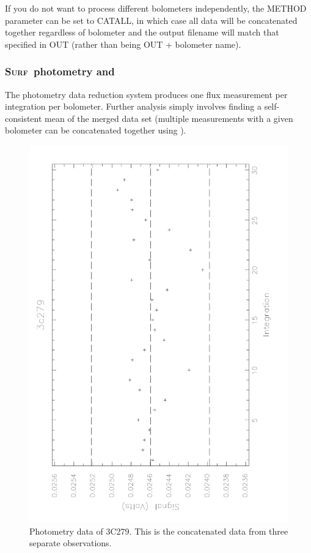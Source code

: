 \documentclass[twoside,11pt]{starlink}
\providecommand{\scusoft}          {\textsc{Surf}}
\providecommand{\task}[1]{#1}
\providecommand{\scucat}{\htmlref{\task{scucat}}{SCUCAT}}
\begin{document}
If you do not want to process different bolometers independently, the
METHOD parameter can be set to CATALL, in which case all data will
be concatenated together regardless of bolometer and the output filename
will match that specified in OUT (rather than being OUT + bolometer name).


\subsubsection{\scusoft\ photometry and }

The photometry data reduction system produces one flux measurement per
integration per bolometer. Further analysis simply involves finding a
self-consistent mean of the merged data set (multiple measurements with a
given bolometer can be concatenated together using \scucat).

\begin{figure}
\begin{center}
\includegraphics[angle=270,width=5in]{sun216_qdraw}
\caption{Photometry data of 3C279. This is the concatenated data from three
separate observations.}
\label{qdrawfig}
\end{center}
\end{figure}
\end{document}
